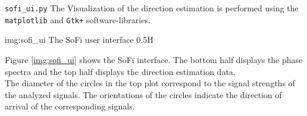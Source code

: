\newpage

\begin{subchapter}{\texttt{sofi\_ui.py}}
  The Visualization of the direction estimation is performed
  using the \texttt{matplotlib} and \texttt{Gtk+} software-libraries.

               {img:sofi_ui}
               {The SoFi user interface}
               {0.5}{H}

  Figure \ref{img:sofi_ui} shows the SoFi interface.
  The bottom half displays the phase spectra and
  the top half displays the direction estimation data. \\

  The diameter of the circles in the top plot correspond
  to the signal strengths of the analyzed signals.
  The orientations of the circles indicate the direction
  of arrival of the corresponding signals.
\end{subchapter}
